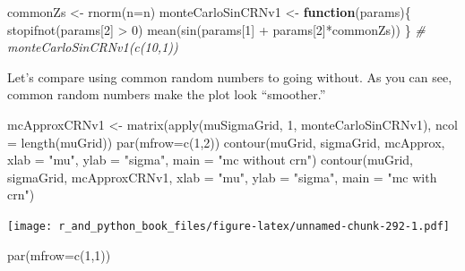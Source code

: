 \documentclass[
  12pt,
  krantz2]{krantz}
\makeatletter
\newenvironment{Shaded}{\begin{snugshade}}{\end{snugshade}}
\newcommand{\AttributeTok}[1]{\textcolor[rgb]{0.61,0.61,0.61}{#1}}
\newcommand{\CommentTok}[1]{\textcolor[rgb]{0.37,0.37,0.37}{\textit{#1}}}
\newcommand{\ControlFlowTok}[1]{\textcolor[rgb]{0.27,0.27,0.27}{\textbf{#1}}}
\newcommand{\DecValTok}[1]{\textcolor[rgb]{0.06,0.06,0.06}{#1}}
\newcommand{\FunctionTok}[1]{\textcolor[rgb]{0,0,0}{#1}}
\newcommand{\NormalTok}[1]{#1}
\newcommand{\OtherTok}[1]{\textcolor[rgb]{0.37,0.37,0.37}{#1}}
\newcommand{\SpecialCharTok}[1]{\textcolor[rgb]{0,0,0}{#1}}
\newcommand{\StringTok}[1]{\textcolor[rgb]{0.5,0.5,0.5}{#1}}
\newenvironment{kframe}{%
\medskip{}
\setlength{\fboxsep}{.8em}
 \def\at@end@of@kframe{}%
 \ifinner\ifhmode%
  \def\at@end@of@kframe{\end{minipage}}%
  \begin{minipage}{\columnwidth}%
 \fi\fi%
 \def\FrameCommand##1{\hskip\@totalleftmargin \hskip-\fboxsep
 \colorbox{shadecolor}{##1}\hskip-\fboxsep
     \hskip-\linewidth \hskip-\@totalleftmargin \hskip\columnwidth}%
 \MakeFramed {\advance\hsize-\width
   \@totalleftmargin\z@ \linewidth\hsize
   \@setminipage}}%
 {\par\unskip\endMakeFramed%
 \at@end@of@kframe}
\renewenvironment{Shaded}{\begin{kframe}}{\end{kframe}}
\makeatother
\begin{document}
\begin{Shaded}
\begin{Highlighting}[]
\NormalTok{commonZs }\OtherTok{\textless{}{-}} \FunctionTok{rnorm}\NormalTok{(}\AttributeTok{n=}\NormalTok{n)}
\NormalTok{monteCarloSinCRNv1 }\OtherTok{\textless{}{-}} \ControlFlowTok{function}\NormalTok{(params)\{}
  \FunctionTok{stopifnot}\NormalTok{(params[}\DecValTok{2}\NormalTok{] }\SpecialCharTok{\textgreater{}} \DecValTok{0}\NormalTok{) }
  \FunctionTok{mean}\NormalTok{(}\FunctionTok{sin}\NormalTok{(params[}\DecValTok{1}\NormalTok{] }\SpecialCharTok{+}\NormalTok{ params[}\DecValTok{2}\NormalTok{]}\SpecialCharTok{*}\NormalTok{commonZs))}
\NormalTok{\} }
\CommentTok{\# monteCarloSinCRNv1(c(10,1))}
\end{Highlighting}
\end{Shaded}

Let's compare using common random numbers to going without. As you can see, common random numbers make the plot look ``smoother.''

\begin{Shaded}
\begin{Highlighting}[]
\NormalTok{mcApproxCRNv1 }\OtherTok{\textless{}{-}} \FunctionTok{matrix}\NormalTok{(}\FunctionTok{apply}\NormalTok{(muSigmaGrid, }\DecValTok{1}\NormalTok{, monteCarloSinCRNv1), }\AttributeTok{ncol =} \FunctionTok{length}\NormalTok{(muGrid))}
\FunctionTok{par}\NormalTok{(}\AttributeTok{mfrow=}\FunctionTok{c}\NormalTok{(}\DecValTok{1}\NormalTok{,}\DecValTok{2}\NormalTok{))}
\FunctionTok{contour}\NormalTok{(muGrid, sigmaGrid, mcApprox, }\AttributeTok{xlab =} \StringTok{"mu"}\NormalTok{, }\AttributeTok{ylab =} \StringTok{"sigma"}\NormalTok{, }\AttributeTok{main =} \StringTok{"mc without crn"}\NormalTok{)}
\FunctionTok{contour}\NormalTok{(muGrid, sigmaGrid, mcApproxCRNv1, }\AttributeTok{xlab =} \StringTok{"mu"}\NormalTok{, }\AttributeTok{ylab =} \StringTok{"sigma"}\NormalTok{, }\AttributeTok{main =} \StringTok{"mc with crn"}\NormalTok{)}
\end{Highlighting}
\end{Shaded}

\texttt{[image: r\_and\_python\_book\_files/figure-latex/unnamed-chunk-292-1.pdf]}

\begin{Shaded}
\begin{Highlighting}[]
\FunctionTok{par}\NormalTok{(}\AttributeTok{mfrow=}\FunctionTok{c}\NormalTok{(}\DecValTok{1}\NormalTok{,}\DecValTok{1}\NormalTok{))}
\end{Highlighting}
\end{Shaded}
\end{document}
